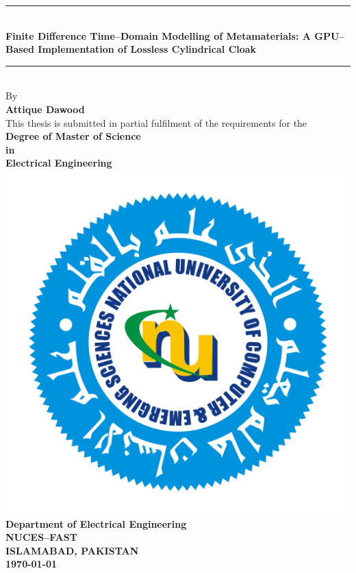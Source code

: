 
\begin{titlepage}
\begin{center}

\rule{\linewidth}{0.5mm}\\[0.3cm]
{\Large \bfseries Finite Difference Time--Domain Modelling of Metamaterials: A GPU--Based Implementation of Lossless Cylindrical Cloak}\\
\rule{\linewidth}{0.5mm}\\[0.5cm]

{\large By}\\[0.5cm]
{\large \bfseries Attique Dawood}\\[1cm]

{\large This thesis is submitted in partial fulfilment of the requirements for the}\\[1cm]
{\large \bfseries Degree of Master of Science\\[0.2cm] in\\[0.2cm] Electrical Engineering}\\[2cm]

\includegraphics[scale=0.15]{Figures/NU_Logo.png}\\[2cm]

{\large \bfseries Department of Electrical Engineering}\\[0.2cm]
{\large \bfseries NUCES--FAST}\\[0.2cm]
{\large \bfseries ISLAMABAD, PAKISTAN}\\[0.2cm]
{\large \bfseries \today}

\end{center}
\end{titlepage}